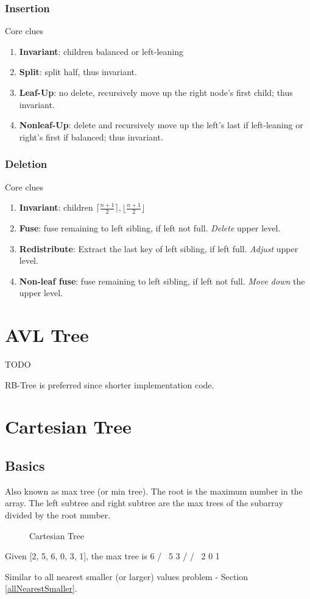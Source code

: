 \subsubsection{Insertion}
Core clues
\begin{enumerate}
\item \textbf{Invariant}: children balanced or left-leaning
\item \textbf{Split}: split half, thus invariant.
\item \textbf{Leaf-Up}: no delete, recursively move up the right node's first child;
thus invariant.
\item \textbf{Nonleaf-Up}: delete and recursively move up the left's last if left-leaning
or right's first if balanced; thus invariant. 
\end{enumerate}
\subsubsection{Deletion}
Core clues
\begin{enumerate}
\item \textbf{Invariant}: children $\lceil\frac{n+1}{2}\rceil, \lfloor\frac{n+1}{2}\rfloor$
\item \textbf{Fuse}: fuse remaining to left sibling, if left not full. \textit{Delete}
upper level.
\item \textbf{Redistribute}: Extract the last key of left sibling, if left full. \textit{Adjust}
upper level.
\item \textbf{Non-leaf fuse}: fuse remaining to left sibling, if left not full. \textit{Move
down} the upper level.
\end{enumerate}
\section{AVL Tree}
TODO

RB-Tree is preferred since shorter implementation code.

\section{Cartesian Tree}
\subsection{Basics}
Also known as max tree (or min tree). The root is the maximum number in the array. The left subtree and right subtree are the max trees of the subarray divided by the root number.
\begin{figure}[hbtp]
\centering
{}
\caption{Cartesian Tree}
\label{fig:cartesianTree}
\end{figure}
\begin{java}
Given [2, 5, 6, 0, 3, 1], the max tree is
     6
    / \
   5   3
  /   / \
 2   0   1
\end{java}
 Similar to all nearest smaller (or larger) values problem - Section \ref{allNearestSmaller}.

